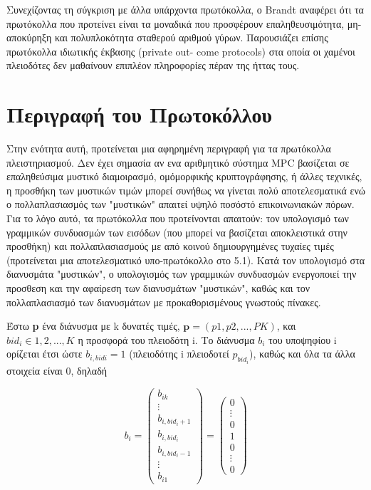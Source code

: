 \documentclass[a4paper,11pt]{article}
\begin{document}
	Συνεχίζοντας τη σύγκριση με άλλα υπάρχοντα πρωτόκολλα, ο Brandt αναφέρει ότι τα πρωτόκολλα που προτείνει είναι τα
	μοναδικά που προσφέρουν επαληθευσιμότητα, μη-αποκύρηξη και πολυπλοκότητα σταθερού αριθμού γύρων. Παρουσιάζει επίσης πρωτόκολλα
	ιδιωτικής έκβασης (private out- come protocols) στα οποία οι χαμένοι πλειοδότες δεν μαθαίνουν επιπλέον πληροφορίες πέραν της
	ήττας τους.
	
\section{Περιγραφή του Πρωτοκόλλου}

Στην ενότητα αυτή, προτείνεται μια αφηρημένη περιγραφή για τα πρωτόκολλα πλειστηριασμού. Δεν έχει σημασία αν ενα αριθμητικό σύστημα MPC βασίζεται
σε επαληθεύσιμα μυστικό διαμοιρασμό, ομόμορφικής κρυπτογράφησης, ή άλλες τεχνικές, η προσθήκη των μυστικών τιμών μπορεί συνήθως να γίνεται πολύ
αποτελεσματικά ενώ ο πολλαπλασιασμός των "μυστικών" απαιτεί υψηλό ποσόστό επικοινωνιακών πόρων. Για το λόγο αυτό, τα πρωτόκολλα που προτείνονται
απαιτούν: τον υπολογισμό των γραμμικών συνδυασμών των εισόδων (που μπορεί να βασίζεται αποκλειστικά στην προσθήκη) και πολλαπλασιασμούς με από
κοινού δημιουργημένες τυχαίες τιμές (προτείνεται μια αποτελεσματικό υπο-πρωτόκολλο στο 5.1). Κατά τον υπολογισμό στα διανυσμάτα "μυστικών", ο
υπολογισμός των γραμμικών συνδυασμών ενεργοποιεί την προσθεση και την αφαίρεση των διανυσμάτων "μυστικών", καθώς και τον πολλαπλασιασμό των
διανυσμάτων με προκαθορισμένους γνωστούς πίνακες.

Έστω \textbf{p} ένα διάνυσμα με k δυνατές τιμές, $\textbf{p}=(p1,p2,...,PK)$, και $bid_i \in {1, 2,. . . , K}$ η προσφορά του πλειοδότη i. Το
διάνυσμα $b_i$ του υποψηφίου i ορίζεται έτσι ώστε $b_{i,bidi}=1$ (πλειοδότης i πλειοδοτεί $p_{bid_i}$), καθώς και όλα τα άλλα στοιχεία είναι 0,
δηλαδή

\begin{displaymath}
	b_i = 
	\left ( \begin{array}{c}
		b_{ik}	\\
		\vdots	\\
		b_{i,bid_i+1} \\
		b_{i,bid_i}	\\
		b_{i,bid_i-1} \\
		\vdots \\
		b_{i1}
	\end{array} \right)
	=
	\left ( \begin{array}{c}
	0	\\
	\vdots \\
	0 \\
	1 \\
	0 \\
	\vdots \\
	0
	\end{array} \right)
\end{displaymath}
\end{document}

